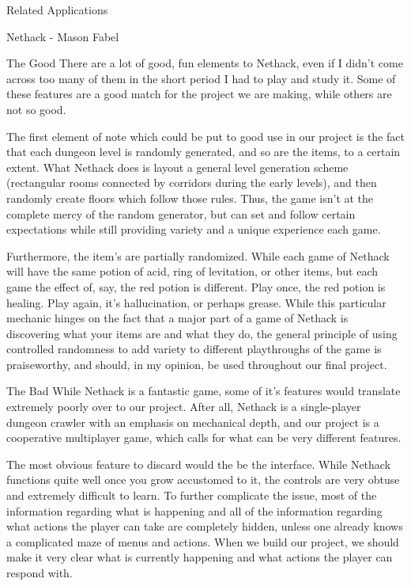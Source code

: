 \documentclass[12pt]{report}
\begin{document}
\begin{section}{Related Applications}
\begin{subsection}{Nethack - Mason Fabel}
\begin{subsubsection}{The Good}
There are a lot of good, fun elements to Nethack, even if I didn't come
across too many of them in the short period I had to play and study it.
Some of these features are a good match for the project we are making,
while others are not so good.

The first element of note which could be put to good use in our project
is the fact that each dungeon level is randomly generated, and so are
the items, to a certain extent. What Nethack does is layout a general
level generation scheme (rectangular rooms connected by corridors during
the early levels), and then randomly create floors which follow those
rules. Thus, the game isn't at the complete mercy of the random generator,
but can set and follow certain expectations while still providing variety
and a unique experience each game.

Furthermore, the item's are partially randomized. While each game of
Nethack will have the same potion of acid, ring of levitation, or other
items, but each game the effect of, say, the red potion is different.
Play once, the red potion is healing. Play again, it's hallucination, or
perhaps grease. While this particular mechanic hinges on the fact that a
major part of a game of Nethack is discovering what your items are and
what they do, the general principle of using controlled randomness to add
variety to different playthroughs of the game is praiseworthy, and should,
in my opinion, be used throughout our final project.
\end{subsubsection}

\begin{subsubsection}{The Bad}
While Nethack is a fantastic game, some of it's features would translate
extremely poorly over to our project. After all, Nethack is a single-player
dungeon crawler with an emphasis on mechanical depth, and our project
is a cooperative multiplayer game, which calls for what can be very
different features.

The most obvious feature to discard would the be the interface. While
Nethack functions quite well once you grow accustomed to it, the controls
are very obtuse and extremely difficult to learn. To further complicate
the issue, most of the information regarding what is happening and all of
the information regarding what actions the player can take are completely
hidden, unless one already knows a complicated maze of menus and actions.
When we build our project, we should make it very clear what is currently
happening and what actions the player can respond with.


\end{subsubsection}
\end{subsection}
\end{section}
\end{document}
